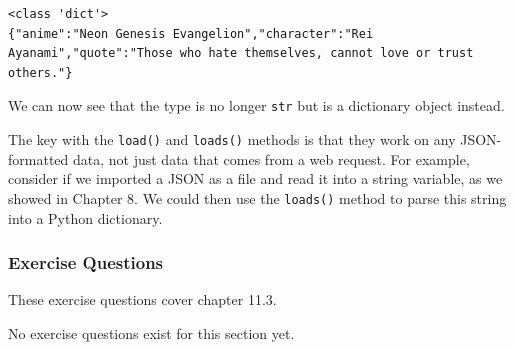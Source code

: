 \begin{lstlisting}[style=none]
<class 'dict'>
{"anime":"Neon Genesis Evangelion","character":"Rei Ayanami","quote":"Those who hate themselves, cannot love or trust others."}
\end{lstlisting}
We can now see that the type is no longer \verb|str| but is a dictionary object instead.\par
The key with the \verb|load()| and \verb|loads()| methods is that they work on any JSON-formatted data, not just data that comes from a web request. For example, consider if we imported a JSON as a file and read it into a string variable, as we showed in Chapter 8. We could then use the \verb|loads()| method to parse this string into a Python dictionary.

\subsubsection*{Exercise Questions}
These exercise questions cover chapter 11.3.

No exercise questions exist for this section yet.
